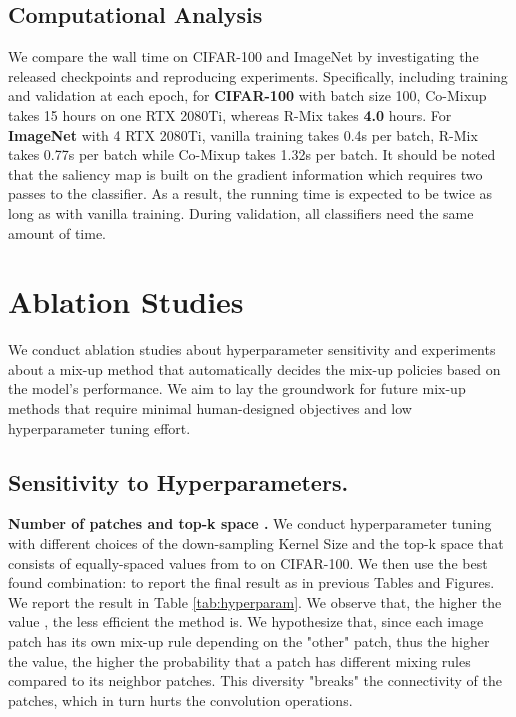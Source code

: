 \documentclass[letterpaper]{article} \usepackage[submission]{aaai23}  \usepackage{times}  \usepackage{helvet}  \usepackage{courier}  \usepackage[hyphens]{url}  \usepackage{graphicx} \urlstyle{rm} \def\UrlFont{\rm}  \usepackage{natbib}  \usepackage{caption} \frenchspacing  \setlength{\pdfpagewidth}{8.5in} \setlength{\pdfpageheight}{11in}
\newcommand{\comixup}{{Co-Mixup}}
\newcommand{\rrlmix}{{R-Mix}}
\newcommand{\cifar}{CIFAR-100}
\newcommand{\imagenet}{ImageNet}
\begin{document}
\subsection{Computational Analysis}
We compare the wall time on \cifar{} and \imagenet{} by investigating the released checkpoints and reproducing experiments. Specifically, including training and validation at each epoch, for \textbf{\cifar{}} with batch size 100, \comixup{} takes 15 hours on one RTX 2080Ti, whereas \rrlmix{} takes \textbf{4.0} hours. For \textbf{\imagenet{}} with 4 RTX 2080Ti, vanilla training takes 0.4s per batch, \rrlmix{} takes 0.77s per batch while \comixup{} takes 1.32s per batch. It should be noted that the saliency map is built on the gradient information \cite{simonyan2014sal} which requires two passes to the classifier. As a result, the running time is expected to be twice as long as with vanilla training. During validation, all classifiers need the same amount of time.

\section{Ablation Studies}
\label{sec:abl-study}
We conduct ablation studies about hyperparameter sensitivity and experiments about a mix-up method that automatically decides the mix-up policies based on the model's performance. We aim to lay the groundwork for future mix-up methods that require minimal human-designed objectives and low hyperparameter tuning effort.


\subsection{Sensitivity to Hyperparameters.}
\textbf{Number of patches  and top-k space .} We conduct hyperparameter tuning with different choices of the down-sampling Kernel Size  and the top-k space that consists of  equally-spaced values from  to  on \cifar{}. We then use the best found combination:  to report the final result as in previous Tables and Figures. We report the result in Table \ref{tab:hyperparam}. We observe that, the higher the value , the less efficient the method is. We hypothesize that, since each image patch has its own mix-up rule depending on the "other" patch, thus the higher the  value, the higher the probability that a patch has different mixing rules compared to its neighbor patches. This diversity "breaks" the connectivity of the patches, which in turn hurts the convolution operations.
\end{document}
